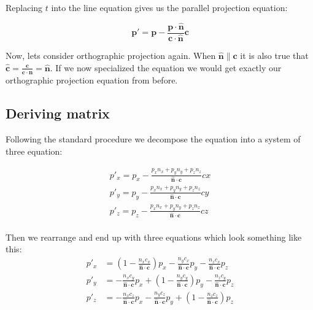 \documentclass[]{report}   %
\begin{document}
Replacing \(t\) into the line equation gives us the parallel projection equation:
\begin{mdframed}
\[
	\mathbf{p\prime} = \mathbf{p} - \frac{\mathbf{p} \cdot \mathbf{\hat{n}}}{\mathbf{c} \cdot \mathbf{\hat{n}}} 
	\mathbf{c}
\]
\end{mdframed}


Now, lets consider orthographic projection again. When \(\mathbf{\hat{n}} \parallel \mathbf{c}\) it is also true that \(\mathbf{\hat{c}} = \frac{\mathbf{c}}{\mathbf{c} \cdot \mathbf{\hat{n}}} = \mathbf{\hat{n}}\). If we now specialized the equation we would get exactly our orthographic projection equation from before.


\subsection{Deriving matrix}

Following the standard procedure we decompose the equation into a system of three equation:

\begin{align*}
	p\prime_x = p_x - \frac	{p_x n_x + p_y n_y + p_z n_z}
							{\mathbf{\hat{n}}\cdot\mathbf{c}} cx	\\
	p\prime_y = p_y - \frac	{p_x n_x + p_y n_y + p_z n_z}
							{\mathbf{\hat{n}}\cdot\mathbf{c}} cy	\\
	p\prime_z = p_z - \frac	{p_x n_x + p_y n_y + p_z n_z}
							{\mathbf{\hat{n}}\cdot\mathbf{c}} cz	\\
\end{align*}

Then we rearrange and end up with three equations which look something like this:
\begin{align*}
	p\prime_x &=(1 - \frac{n_x c_x}{\mathbf{\hat{n}}\cdot\mathbf{c}}) p_x 
				   - \frac{n_y c_x}{\mathbf{\hat{n}}\cdot\mathbf{c}}  p_y
				   - \frac{n_z c_x}{\mathbf{\hat{n}}\cdot\mathbf{c}}  p_z
				\\
	p\prime_y &= - \frac{n_x c_y}{\mathbf{\hat{n}}\cdot\mathbf{c}}	p_x
			+(1 - \frac{n_y c_y}{\mathbf{\hat{n}}\cdot\mathbf{c}})	p_y
				 - \frac{n_z c_y}{\mathbf{\hat{n}}\cdot\mathbf{c}}	p_z
				\\
	p\prime_z &= - \frac{n_x c_z}{\mathbf{\hat{n}}\cdot\mathbf{c}}	p_x
				 - \frac{n_y c_z}{\mathbf{\hat{n}}\cdot\mathbf{c}}	p_y
			+(1 - \frac{n_z c_z}{\mathbf{\hat{n}}\cdot\mathbf{c}})	p_z
\end{align*}
\end{document}

